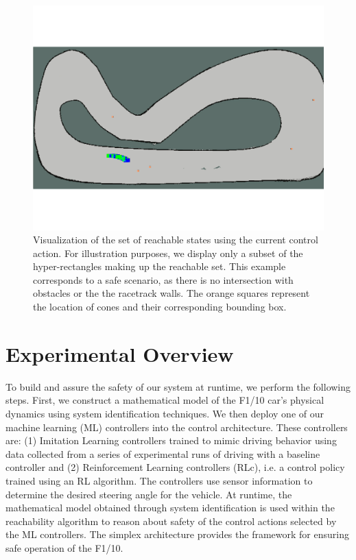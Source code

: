 \documentclass[manuscript,screen,review]{acmart}
\begin{document}
\begin{figure}[htpb]%
  \centering
    \includegraphics[width=0.75\linewidth]{figures/viz_option_two.pdf}
   \caption{Visualization of the set of reachable states using the current control action. For illustration purposes, we display only a subset of the hyper-rectangles making up the reachable set. This example corresponds to a safe scenario, as there is no intersection with obstacles or the the racetrack walls. The orange squares represent the location of cones and their corresponding bounding box.}
  \label{fig:reachset}
\end{figure}



\section{Experimental Overview}

To build and assure the safety of our system at runtime, we perform the following steps. First, we construct a mathematical model of the F1/10 car's physical dynamics using system identification techniques. We then deploy one of our machine learning (ML) controllers into the control architecture. These controllers are: (1) Imitation Learning controllers trained to mimic driving behavior using data collected from a series of experimental runs of driving with a baseline controller and (2) Reinforcement Learning controllers (RLc), i.e. a control policy trained using an RL algorithm. The controllers use sensor information to determine the desired steering angle for the vehicle. At runtime, the mathematical model obtained through system identification is used within the reachability algorithm to reason about safety of the control actions selected by the ML controllers. The simplex architecture provides the framework for ensuring safe operation of the F1/10.
\end{document}
